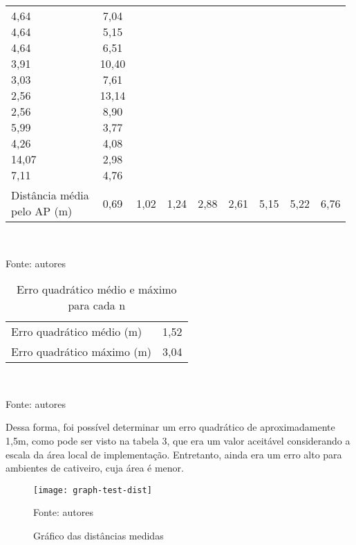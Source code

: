 \begin{table}[ht]
\begin{tabular}{l|cccccccc}
\makecell{4,64 \\ 4,64 \\ 4,64 \\ 3,91 \\ 3,03 \\ 2,56 \\ 2,56 \\ 5,99 \\ 4,26 \\ 14,07 \\ 7,11} &
\makecell{7,04 \\ 5,15 \\ 6,51 \\ 10,40 \\ 7,61 \\ 13,14 \\ 8,90 \\ 3,77 \\ 4,08 \\ 2,98 \\ 4,76}
\vspace{0.4cm}\\

\makecell{Distância média \\ pelo AP (m)} & 0,69 & 1,02 & 1,24 & 2,88 & 2,61 & 5,15 & 5,22 & 6,76
\end{tabular}
\vspace{0.4cm}\\
\centerline{\small{Fonte: autores}}
\end{table}

\begin{table}[ht]
\centering
\caption{Erro quadrático médio e máximo para cada n}
\vspace{0.5cm}
\begin{tabular}{l|c}
\hline
Erro quadrático médio (m) & 1,52 \vspace{0.4cm}\\
Erro quadrático máximo (m) & 3,04
\end{tabular}
\vspace{0.4cm}\\
\centerline{\small{Fonte: autores}}
\end{table}

Dessa forma, foi possível determinar um erro quadrático de aproximadamente 1,5m, como pode ser visto na tabela 3, que era um valor aceitável considerando a escala da área local de implementação. Entretanto, ainda era um erro alto para ambientes de cativeiro, cuja área é menor.

\begin{figure}[ht]
  \centering
    \caption{Gráfico das distâncias medidas}
    \texttt{[image: graph-test-dist]}
  \centerline{\small{Fonte: autores}}
\end{figure}

